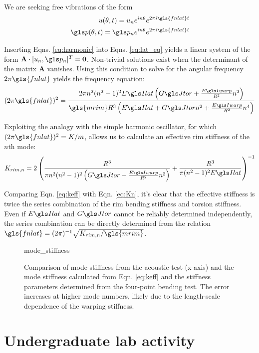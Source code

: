 \documentclass[../thesis.tex]{subfiles}
\begin{document}
We are seeking free vibrations of the form
  \begin{subequations}\label{eq:harmonic}
  \begin{align}
  u(\theta, t)=u_n e^{in\theta}e^{2\pi i \gls{fnlat} t}\\
  \p(\theta, t)=\p_n e^{in\theta}e^{2\pi i \gls{fnlat} t}
  \end{align}
  \end{subequations}

Inserting Eqns. \eqref{eq:harmonic} into Eqns. \eqref{eq:lat_eq} yields a linear system of the form $\mathbf{A}\cdot [u_n, \p_n]^T=\mathbf{0}$. Non-trivial solutions exist when the determinant of the matrix $\mathbf{A}$ vanishes. Using this condition to solve for the angular frequency $2\pi \gls{fnlat}$ yields the frequency equation:
  \begin{equation}\label{eq:lat_freq_eq}
  (2\pi \gls{fnlat})^2 = \frac{2\pi n^2(n^2-1)^2\EIl\left(\GJ + \frac{\EIw}{R^2}n^2 \right)}
                  {\gls{mrim} R^3 \left( \EIl + \GJ n^2 + \frac{\EIw}{R^2}n^4\right)}
  \end{equation}

Exploiting the analogy with the simple harmonic oscillator, for which $(2\pi \gls{fnlat})^2=K/m$, allows us to calculate an effective rim stiffness of the $n$th mode:
  \begin{equation}\label{eq:keff}
  K_{rim,n} = 2 \left( \frac{R^3}{\pi n^2(n^2-1)^2\left( \GJ + \frac{\EIw}{R^2}n^2\right)} +
    \frac{R^3}{\pi(n^2-1)^2\EIl} \right)^{-1}
  \end{equation}

Comparing Eqn. \eqref{eq:keff} with Eqn. \eqref{eq:Kn}, it's clear that the effective stiffness is twice the series combination of the rim bending stiffness and torsion stiffness. Even if $\EIl$ and $\GJ$ cannot be reliably determined independently, the series combination can be directly determined from the relation $\gls{fnlat} = (2\pi)^{-1}\sqrt{K_{rim,n}/\gls{mrim}}$.

\begin{figure}
  {mode_stiffness}
  \caption{Comparison of mode stiffness from the acoustic test (x-axis) and the mode stiffness calculated from Eqn. \eqref{eq:keff} and the stiffness parameters determined from the four-point bending test. The error increases at higher mode numbers, likely due to the length-scale dependence of the warping stiffness.}
  \label{fig:keff}
\end{figure}


\section{Undergraduate lab activity}
\inprogress
\end{document}
